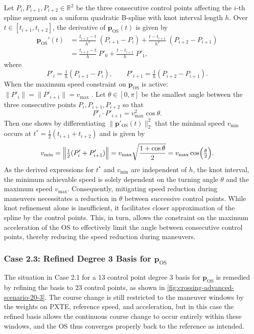 Let $P_i,P_{i+1},P_{i+2}\in\mathbb R^2$ be the three consecutive control points affecting the $i$-th spline segment on a uniform quadratic B-spline with knot interval length $h$.  Over $t\in[t_{i+1}, t_{i+2}]$, the derivative of $\mathbf p_\text{OS}(t)$ is given by
\begin{equation*}
    \begin{aligned}
        \mathbf p_\text{OS}'(t) 
        &=\frac{t_{i+2}-t}{h^2}\;(P_{i+1}-P_i) 
        +\frac{t - t_{i+1}}{h^2}\;(P_{i+2}-P_{i+1})\\
        &=\frac{t_{i+2}-t}{h}\;P'_0
        +\frac{t - t_{i+1}}{h}\;P'_1,
    \end{aligned}
\end{equation*}
where
\begin{equation*}
P'_i = \tfrac1h (P_{i+1} - P_i),
\qquad
P'_{i+1} = \tfrac1h(P_{i+2} - P_{i+1}).
\end{equation*}
When the maximum speed constraint on $\mathbf p_\text{OS}$ is active: $\|P'_i\|=\|P'_{i+1}\|=v_{\max}$ .  Let $\theta\in[0,\pi]$ be the smallest angle between the three consecutive points $P_i,P_{i+1},P_{i+2}$ so that
\begin{equation*}
P'_i\cdot P'_{i+1} = v_{\max}^2\cos\theta.
\end{equation*}
Then one shows by differentiating $\|\mathbf p'_\text{OS}(t)\|_2^2$ that the minimal speed $v_{\min}$ occurs at $t^*=\tfrac12(t_{i+1}+t_{i+2})$ and is given by
\begin{equation*}
v_{\min}
=\Bigl\|\tfrac12(P'_i+P'_{i+1})\Bigr\|
=v_{\max}\sqrt{\frac{1+\cos\theta}{2}}
=v_{\max}\cos\Bigl(\tfrac\theta2\Bigr).
\end{equation*}
As the derived expressions for $t^*$ and $v_{\min}$ are independent of $h$, the knot interval, the minimum achievable speed is solely dependent on the turning angle $\theta$ and the maximum speed $v_{\max}$. Consequently, mitigating speed reduction during maneuvers necessitates a reduction in $\theta$ between successive control points. While knot refinement alone is insufficient, it facilitates closer approximation of the spline by the control points. This, in turn, allows the constraint on the maximum acceleration of the OS to effectively limit the angle between consecutive control points, thereby reducing the speed reduction during maneuvers.


\subsubsection{Case 2.3: Refined Degree 3 Basis for $\mathbf p_\text{OS}$}
The situation in Case 2.1 for a 13 control point degree 3 basis for $\mathbf p_\text{OS}$ is remedied by refining the basis to 23 control points, as shown in \cref{fig:crossing-advanced-scenario-20-3}. The course change is still restricted to the maneuver windows by the weights on PXTE, reference speed, and acceleration, but in this case the refined basis allows the continuous course change to occur entirely within these windows, and the OS thus converges properly back to the reference as intended.


